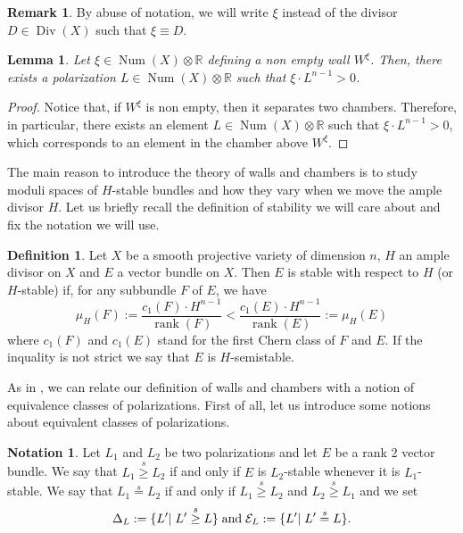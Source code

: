 \documentclass[11pt,twoside]{amsart}
\newtheorem{lemma}[theorem]{Lemma}
\theoremstyle{definition}
\newtheorem{remark}[theorem]{Remark}
\newtheorem{definition}[theorem]{Definition}
\newtheorem{notation}[theorem]{Notation}
\newcommand{\Num}{\operatorname{Num}}
\newcommand{\Div}{\operatorname{Div}}
\newcommand{\rank}{\operatorname{rank}}
\begin{document}
\begin{remark}
    By abuse of notation, we will write $\xi$ instead of the divisor $D\in \Div(X)$ such that $\xi\equiv D$.
\end{remark}


\begin{lemma}
\label{lema_pared}
Let $\xi\in\Num(X)\otimes\mathbb{R}$ defining a non empty wall $W^{\xi}$. Then, there exists a polarization $L\in \Num(X)\otimes\mathbb{R}$ such that $\xi\cdot L^{n-1}>0$.
\end{lemma}
\begin{proof}
Notice that, if $W^{\xi}$ is non empty, then it separates two chambers. Therefore, in particular, there exists an element $L\in \Num(X)\otimes\mathbb{R}$ such that $\xi\cdot L^{n-1}>0$, which corresponds to an element in the chamber above $W^{\xi}$.
\end{proof}
\vspace{3mm}
The main reason to introduce the theory of walls and chambers is to study moduli spaces of $H$-stable bundles and how they vary when we move the ample divisor $H$. Let us briefly recall the definition of stability we will care about and fix the notation we will use.

\begin{definition}
Let $X$ be a smooth projective variety of dimension $n$,  $H$ an ample divisor on $X$ and $E$  a vector bundle on $X$.  Then $E$ is stable with respect to $H$ (or $H$-stable) if, for any subbundle $F$ of $E$, we have $$\mu_H(F):=\frac{c_1(F)\cdot H^{n-1}}{\rank(F)}<\frac{c_1(E)\cdot H^{n-1}}{\rank(E)}:=\mu_H(E)$$
where $c_1(F)$ and $c_1(E)$ stand for the first Chern class of $F$ and $E$. If the inquality is not strict we say that $E$ is $H$-semistable. 
\end{definition}


    
As in \cite{Qin1}, we can relate our definition of walls and chambers with a notion of equivalence classes of polarizations.
First of all, let us introduce some notions about equivalent classes of polarizations.


\begin{notation}
    

Let $L_1$ and $L_2$ be two polarizations and let $E$ be a rank 2 vector bundle. We say that $L_1\overset{s}{\geq} L_2$ if and only if $E$ is $L_2$-stable whenever it is $L_1$-stable.
We say that $L_1\overset{s}{=}L_2$ if and only if $L_1\overset{s}{\geq} L_2$ and $L_2\overset{s}{\geq} L_1$ and we set $$\Delta_L:=\{L'| \thickspace L'\overset{s}{\geq} L\} \thickspace\text {and} \thickspace\mathcal{E}_L:=\{L'|\thickspace L'\overset{s}{=} L\}.$$
\end{notation}
\end{document}
